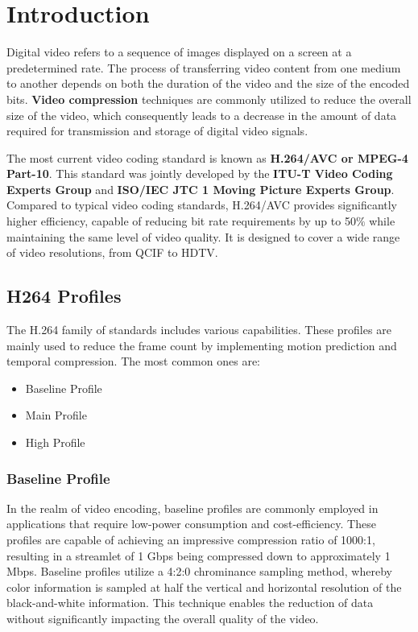 
\chapter{Introduction} %
\label{Chapter1}

Digital video refers to a sequence of images displayed on a screen at a predetermined rate. The process of transferring video content from one medium to another depends on both the duration of the video and the size of the encoded bits. \textbf{Video compression} techniques are commonly utilized to reduce the overall size of the video, which consequently leads to a decrease in the amount of data required for transmission and storage of digital video signals.

The most current video coding standard is known as \textbf{H.264/AVC or MPEG-4 Part-10}. This standard was jointly developed by the \textbf{ITU-T Video Coding Experts Group} and \textbf{ISO/IEC JTC 1 Moving Picture Experts Group}. Compared to typical video coding standards, H.264/AVC provides significantly higher efficiency, capable of reducing bit rate requirements by up to 50$\%$ while maintaining the same level of video quality. It is designed to cover a wide range of video resolutions, from QCIF to HDTV. 

\section{H264 Profiles}
The H.264 family of standards includes various capabilities. These profiles are mainly used to reduce the frame count by implementing motion prediction and temporal compression. The most common ones are:

\begin{itemize}
	\item Baseline Profile
	\item Main Profile
	\item High Profile
\end{itemize}

\subsection{Baseline Profile}
In the realm of video encoding, baseline profiles are commonly employed in applications that require low-power consumption and cost-efficiency. These profiles are capable of achieving an impressive compression ratio of 1000:1, resulting in a streamlet of 1 Gbps being compressed down to approximately 1 Mbps. Baseline profiles utilize a 4:2:0 chrominance sampling method, whereby color information is sampled at half the vertical and horizontal resolution of the black-and-white information. This technique enables the reduction of data without significantly impacting the overall quality of the video.

